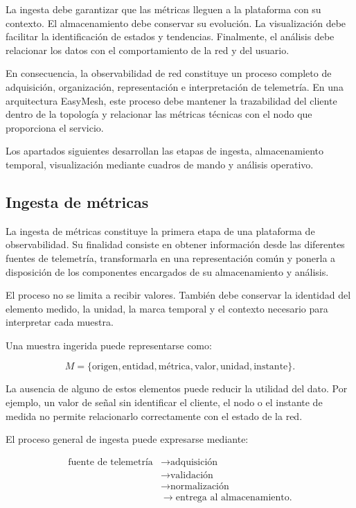 La ingesta debe garantizar que las métricas lleguen a la plataforma con
su contexto. El almacenamiento debe conservar su evolución. La
visualización debe facilitar la identificación de estados y tendencias.
Finalmente, el análisis debe relacionar los datos con el comportamiento
de la red y del usuario.

En consecuencia, la observabilidad de red constituye un proceso completo
de adquisición, organización, representación e interpretación de
telemetría. En una arquitectura EasyMesh, este proceso debe mantener la
trazabilidad del cliente dentro de la topología y relacionar las métricas
técnicas con el nodo que proporciona el servicio.

Los apartados siguientes desarrollan las etapas de ingesta,
almacenamiento temporal, visualización mediante cuadros de mando y
análisis operativo.

\subsection{Ingesta de métricas}
\label{subsec:ingesta-metricas}

La ingesta de métricas constituye la primera etapa de una plataforma de
observabilidad. Su finalidad consiste en obtener información desde las
diferentes fuentes de telemetría, transformarla en una representación
común y ponerla a disposición de los componentes encargados de su
almacenamiento y análisis.

El proceso no se limita a recibir valores. También debe conservar la
identidad del elemento medido, la unidad, la marca temporal y el contexto
necesario para interpretar cada muestra.

Una muestra ingerida puede representarse como:

\[
    M =
    \{
        \text{origen},
        \text{entidad},
        \text{métrica},
        \text{valor},
        \text{unidad},
        \text{instante}
    \}.
\]

La ausencia de alguno de estos elementos puede reducir la utilidad del
dato. Por ejemplo, un valor de señal sin identificar el cliente, el nodo
o el instante de medida no permite relacionarlo correctamente con el
estado de la red.

El proceso general de ingesta puede expresarse mediante:

\[
\begin{aligned}
    \text{fuente de telemetría}
    &\longrightarrow
    \text{adquisición}\\
    &\longrightarrow
    \text{validación}\\
    &\longrightarrow
    \text{normalización}\\
    &\longrightarrow
    \text{entrega al almacenamiento}.
\end{aligned}
\]


